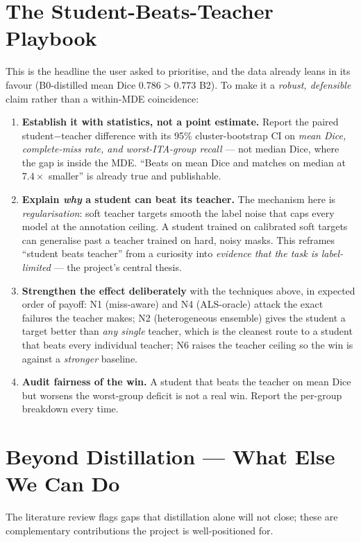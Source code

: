 \documentclass[11pt]{article}
\begin{document}
\section{The Student-Beats-Teacher Playbook}

This is the headline the user asked to prioritise, and the data already leans in its favour
(B0-distilled mean Dice $0.786 > 0.773$ B2). To make it a \emph{robust, defensible} claim rather
than a within-MDE coincidence:

\begin{enumerate}[leftmargin=1.4em,itemsep=2pt]
  \item \textbf{Establish it with statistics, not a point estimate.} Report the paired
  student$-$teacher difference with its 95\% cluster-bootstrap CI on \emph{mean Dice,
  complete-miss rate, and worst-ITA-group recall} --- not median Dice, where the gap is inside
  the MDE. ``Beats on mean Dice and matches on median at $7.4\times$ smaller'' is already true
  and publishable.
  \item \textbf{Explain \emph{why} a student can beat its teacher.} The mechanism here is
  \emph{regularisation}: soft teacher targets smooth the label noise that caps every model at the
  annotation ceiling. A student trained on calibrated soft targets can generalise past a teacher
  trained on hard, noisy masks. This reframes ``student beats teacher'' from a curiosity into
  \emph{evidence that the task is label-limited} --- the project's central thesis.
  \item \textbf{Strengthen the effect deliberately} with the techniques above, in expected order
  of payoff: N1 (miss-aware) and N4 (ALS-oracle) attack the exact failures the teacher makes;
  N2 (heterogeneous ensemble) gives the student a target better than \emph{any single} teacher,
  which is the cleanest route to a student that beats every individual teacher; N6 raises the
  teacher ceiling so the win is against a \emph{stronger} baseline.
  \item \textbf{Audit fairness of the win.} A student that beats the teacher on mean Dice but
  worsens the worst-group deficit is not a real win. Report the per-group breakdown every time.
\end{enumerate}

\section{Beyond Distillation --- What Else We Can Do}

The literature review flags gaps that distillation alone will not close; these are
complementary contributions the project is well-positioned for.
\end{document}
